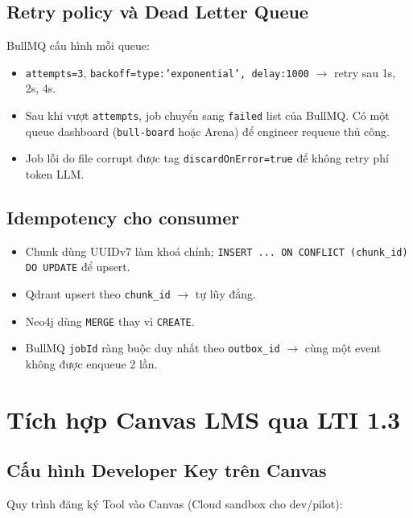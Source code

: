 \subsection{Retry policy và Dead Letter Queue}

BullMQ cấu hình mỗi queue:

\begin{itemize}
    \item \texttt{attempts=3}, \texttt{backoff={type:'exponential',
          delay:1000}} $\to$ retry sau 1s, 2s, 4s.
    \item Sau khi vượt \texttt{attempts}, job chuyển sang
          \texttt{failed} list của BullMQ. Có một queue dashboard
          (\texttt{bull-board} hoặc Arena) để engineer requeue thủ
          công.
    \item Job lỗi do file corrupt được tag
          \texttt{discardOnError=true} để không retry phí token LLM.
\end{itemize}

\subsection{Idempotency cho consumer}

\begin{itemize}
    \item Chunk dùng UUIDv7 làm khoá chính; \texttt{INSERT ... ON
          CONFLICT (chunk\_id) DO UPDATE} để upsert.
    \item Qdrant upsert theo \texttt{chunk\_id} $\to$ tự lũy đẳng.
    \item Neo4j dùng \texttt{MERGE} thay vì \texttt{CREATE}.
    \item BullMQ \texttt{jobId} ràng buộc duy nhất theo
          \texttt{outbox\_id} $\to$ cùng một event không được enqueue 2
          lần.
\end{itemize}

\section{Tích hợp Canvas LMS qua LTI 1.3}
\label{sec:lti-impl}

\subsection{Cấu hình Developer Key trên Canvas}

Quy trình đăng ký Tool vào Canvas (Cloud sandbox cho dev/pilot):

